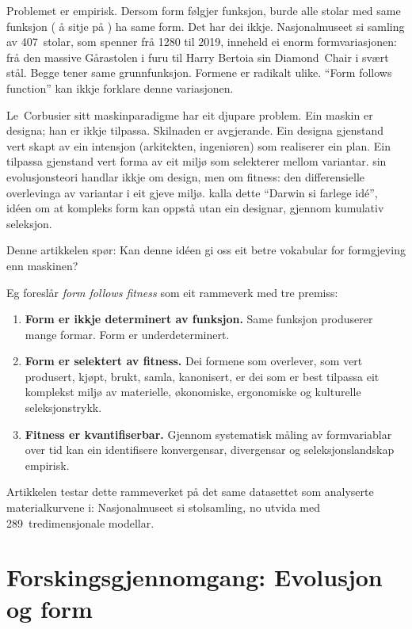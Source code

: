 \documentclass[12pt,a4paper]{article}
\begin{document}
Problemet er empirisk. Dersom form f\o{}lgjer funksjon, burde alle stolar med same funksjon ( \aa{} sitje p\aa{} ) ha same form. Det har dei ikkje. Nasjonalmuseet si samling av 407~stolar, som spenner fr\aa{} 1280 til 2019, inneheld ei enorm formvariasjonen: fr\aa{} den massive G\aa{}rastolen i furu til Harry Bertoia sin Diamond~Chair i sv\ae{}rt st\aa{}l. Begge tener same grunnfunksjon. Formene er radikalt ulike. ``Form follows function'' kan ikkje forklare denne variasjonen.

Le~Corbusier sitt maskinparadigme har eit djupare problem. Ein maskin er designa; han er ikkje tilpassa. Skilnaden er avgjerande. Ein designa gjenstand vert skapt av ein intensjon (arkitekten, ingeni\o{}ren) som realiserer ein plan. Ein tilpassa gjenstand vert forma av eit milj\o{} som selekterer mellom variantar. \citet{darwin1859} sin evolusjonsteori handlar ikkje om design, men om fitness: den differensielle overlevinga av variantar i eit gjeve milj\o{}. \citet{dennett1995} kalla dette ``Darwin si farlege id\'e'', id\'een om at kompleks form kan oppst\aa{} utan ein designar, gjennom kumulativ seleksjon.

Denne artikkelen sp\o{}r: Kan denne id\'een gi oss eit betre vokabular for formgjeving enn maskinen?

Eg foresl\aa{}r \emph{form follows fitness} som eit rammeverk med tre premiss:
\begin{enumerate}
    \item \textbf{Form er ikkje determinert av funksjon.} Same funksjon produserer mange formar. Form er underdeterminert.
    \item \textbf{Form er selektert av fitness.} Dei formene som overlever, som vert produsert, kj\o{}pt, brukt, samla, kanonisert, er dei som er best tilpassa eit komplekst milj\o{} av materielle, \o{}konomiske, ergonomiske og kulturelle seleksjonstrykk.
    \item \textbf{Fitness er kvantifiserbar.} Gjennom systematisk m\aa{}ling av formvariablar over tid kan ein identifisere konvergensar, divergensar og seleksjonslandskap empirisk.
\end{enumerate}

Artikkelen testar dette rammeverket p\aa{} det same datasettet som \citet{finne2026a} analyserte materialkurvene i: Nasjonalmuseet si stolsamling, no utvida med 289~tredimensjonale modellar.

\section{Forskingsgjennomgang: Evolusjon og form}
\end{document}
